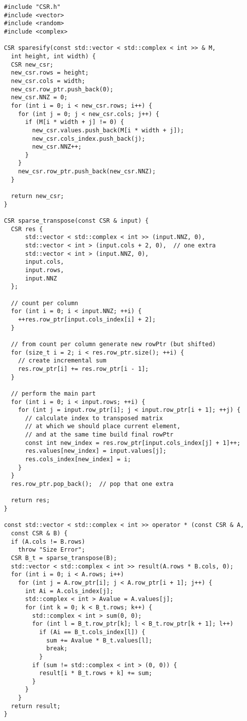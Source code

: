 \documentclass{report}
\begin{document}
\begin{lstlisting}
#include "CSR.h"
#include <vector>
#include <random>
#include <complex>

CSR sparesify(const std::vector < std::complex < int >> & M,
  int height, int width) {
  CSR new_csr;
  new_csr.rows = height;
  new_csr.cols = width;
  new_csr.row_ptr.push_back(0);
  new_csr.NNZ = 0;
  for (int i = 0; i < new_csr.rows; i++) {
    for (int j = 0; j < new_csr.cols; j++) {
      if (M[i * width + j] != 0) {
        new_csr.values.push_back(M[i * width + j]);
        new_csr.cols_index.push_back(j);
        new_csr.NNZ++;
      }
    }
    new_csr.row_ptr.push_back(new_csr.NNZ);
  }

  return new_csr;
}

CSR sparse_transpose(const CSR & input) {
  CSR res {
      std::vector < std::complex < int >> (input.NNZ, 0),
      std::vector < int > (input.cols + 2, 0),  // one extra
      std::vector < int > (input.NNZ, 0),
      input.cols,
      input.rows,
      input.NNZ
  };

  // count per column
  for (int i = 0; i < input.NNZ; ++i) {
    ++res.row_ptr[input.cols_index[i] + 2];
  }

  // from count per column generate new rowPtr (but shifted)
  for (size_t i = 2; i < res.row_ptr.size(); ++i) {
    // create incremental sum
    res.row_ptr[i] += res.row_ptr[i - 1];
  }

  // perform the main part
  for (int i = 0; i < input.rows; ++i) {
    for (int j = input.row_ptr[i]; j < input.row_ptr[i + 1]; ++j) {
      // calculate index to transposed matrix
      // at which we should place current element,
      // and at the same time build final rowPtr
      const int new_index = res.row_ptr[input.cols_index[j] + 1]++;
      res.values[new_index] = input.values[j];
      res.cols_index[new_index] = i;
    }
  }
  res.row_ptr.pop_back();  // pop that one extra

  return res;
}

const std::vector < std::complex < int >> operator * (const CSR & A,
  const CSR & B) {
  if (A.cols != B.rows)
    throw "Size Error";
  CSR B_t = sparse_transpose(B);
  std::vector < std::complex < int >> result(A.rows * B.cols, 0);
  for (int i = 0; i < A.rows; i++)
    for (int j = A.row_ptr[i]; j < A.row_ptr[i + 1]; j++) {
      int Ai = A.cols_index[j];
      std::complex < int > Avalue = A.values[j];
      for (int k = 0; k < B_t.rows; k++) {
        std::complex < int > sum(0, 0);
        for (int l = B_t.row_ptr[k]; l < B_t.row_ptr[k + 1]; l++)
          if (Ai == B_t.cols_index[l]) {
            sum += Avalue * B_t.values[l];
            break;
          }
        if (sum != std::complex < int > (0, 0)) {
          result[i * B_t.rows + k] += sum;
        }
      }
    }
  return result;
}


\end{lstlisting}
\end{document}
